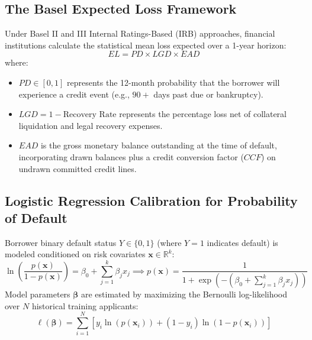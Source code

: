 \subsection{The Basel Expected Loss Framework}
Under Basel II and III Internal Ratings-Based (IRB) approaches, financial institutions calculate the statistical mean loss expected over a 1-year horizon:
\begin{equation}
EL = PD \times LGD \times EAD
\label{eq:basel_el}
\end{equation}
where:
\begin{itemize}
    \item $PD \in [0, 1]$ represents the 12-month probability that the borrower will experience a credit event (e.g., $90+$ days past due or bankruptcy).
    \item $LGD = 1 - \text{Recovery Rate}$ represents the percentage loss net of collateral liquidation and legal recovery expenses.
    \item $EAD$ is the gross monetary balance outstanding at the time of default, incorporating drawn balances plus a credit conversion factor ($CCF$) on undrawn committed credit lines.
\end{itemize}

\subsection{Logistic Regression Calibration for Probability of Default}
Borrower binary default status $Y \in \{0, 1\}$ (where $Y=1$ indicates default) is modeled conditioned on risk covariates $\mathbf{x} \in \mathbb{R}^k$:
\begin{equation}
\ln\left(\frac{p(\mathbf{x})}{1 - p(\mathbf{x})}\right) = \beta_0 + \sum_{j=1}^k \beta_j x_j \implies p(\mathbf{x}) = \frac{1}{1 + \exp\left(-\left(\beta_0 + \sum_{j=1}^k \beta_j x_j\right)\right)}
\label{eq:logistic_pd}
\end{equation}
Model parameters $\boldsymbol{\beta}$ are estimated by maximizing the Bernoulli log-likelihood over $N$ historical training applicants:
\begin{equation}
\ell(\boldsymbol{\beta}) = \sum_{i=1}^N \left[ y_i \ln(p(\mathbf{x}_i)) + (1 - y_i) \ln(1 - p(\mathbf{x}_i)) \right]
\label{eq:log_likelihood}
\end{equation}


